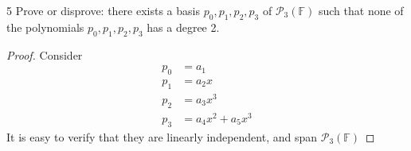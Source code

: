 \documentclass{extarticle}
\newenvironment{problem}[1]{\begin{prob*}{#1}{}}{\end{prob*}}
\newcommand{\F}{\mathbb{F}}
\begin{document}
\begin{problem}{5}
  Prove or disprove: there exists a basis \(p_0, p_1, p_2, p_3\) of \(\mathcal{P}_3 (\F)\)
  such that none of the polynomials \(p_0, p_1, p_2, p_3\) has a degree 2.
\end{problem}
\begin{proof}
  Consider
  \begin{align*}
    p_0 &= a_1 \\
    p_1 &= a_2 x \\
    p_2 &= a_3 x^3 \\
    p_3 &= a_4 x^2 + a_5 x^3
  \end{align*}
  It is easy to verify that they are linearly independent, and span $\mathcal{P}_3(\F)$
\end{proof}


\end{document}
